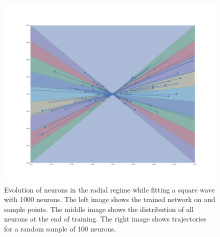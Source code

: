 \begin{figure}
    \includegraphics[width=\linewidth]{figures/radial_trajectories.pdf}
    \endminipage
    \caption{Evolution of neurons in the radial regime while fitting a square wave with 1000 neurons. The left image shows the trained network on and sample points. The middle image shows the distribution of all neurons at the end of training. The right image shows trajectories for a random sample of 100 neurons.}
    \label{fig:radial_trajectores}
\end{figure}


